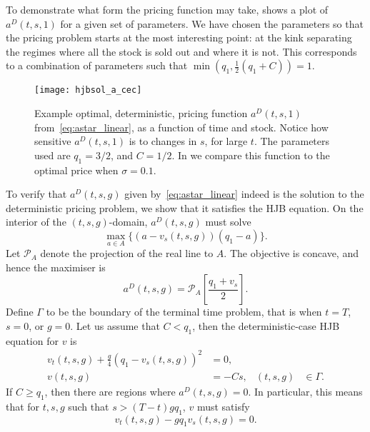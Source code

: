 \documentclass[main.tex]{subfiles}
\begin{document}
\begin{example}\label{ex:acecplot}
  To demonstrate what form the pricing function may take,
   shows a plot of $a^D(t,s,1)$ for a given set of
  parameters. We have chosen the parameters so that the pricing
  problem starts at the most interesting point: at the kink separating
  the regimes where all the stock is sold out and where it is not.
  This corresponds to a combination of parameters such that
  $\min(q_1,\frac{1}{2}(q_1+C))=1$.

  \begin{figure}[htbp]
    \centering
    \texttt{[image: hjbsol\_a\_cec]}
    \caption*{$a^D(t,s,1)$}
    \caption{Example optimal, deterministic, pricing function $a^D(t,s,1)$
      from~\eqref{eq:astar_linear}, as a function of time and stock.
      Notice how sensitive $a^D(t,s,1)$ is to changes in $s$, for large
      $t$.
      The parameters used are $q_1=3/2$, and $C=1/2$.
      In  we compare this function to the optimal price
      when $\sigma=0.1$.
    }\label{fig:hjbsol_a_cec}
  \end{figure}
\end{example}

To verify that $a^D(t,s,g)$ given by~\eqref{eq:astar_linear} indeed is
the solution to the deterministic
pricing problem, we show that it satisfies the HJB equation.
On the interior of the $(t,s,g)$-domain, $a^D(t,s,g)$ must solve
\begin{equation}
  \max_{a\in A} \{(a-v_s(t,s,g))(q_1-a)\}.
\end{equation}
Let $\mathcal{P}_A$ denote the projection of the real line to $A$. The
objective is concave, and hence the maximiser is
\begin{equation}\label{eq:astar_hjb_linear}
  a^D(t,s,g) = \mathcal{P}_A\left[\frac{q_1+v_s}{2}\right].
\end{equation}
Define $\Gamma$ to be the boundary of the terminal time problem,
that is when $t=T$, $s=0$, or $g=0$.
Let us assume that $C< q_1$, then the
deterministic-case HJB equation for $v$ is
\begin{align}\label{eq:hjb_linear}
  v_t(t,s,g)+
  \frac{g}{4}{( q_1-v_s(t,s,g))}^2
  &=0, \\%
  v(t,s,g) &= -Cs,&(t,s,g)&\in \Gamma.
\end{align}
If $C\geq q_1$, then there are regions where $a^D(t,s,g)=0$. In
particular, this means that for $t,s,g$ such that
$s>(T-t)gq_1$, $v$ must satisfy
\begin{equation}\label{eq:hjb_linear_Clarge}
  v_t(t,s,g) - gq_1v_s(t,s,g)=0.
\end{equation}
\end{document}

